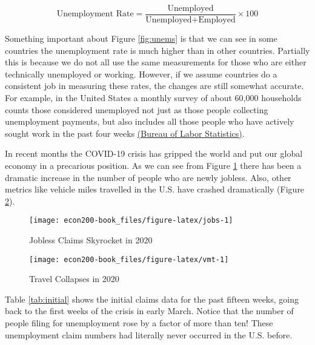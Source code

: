 \documentclass[
]{book}
\begin{document}
\[ \text{Unemployment Rate} = \frac{\text{Unemployed}}{\text{Unemployed} + \text{Employed}} \times 100 \]

Something important about Figure \ref{fig:unems} is that we can see in some countries the unemployment rate is much higher than in other countries. Partially this is because we do not all use the same measurements for those who are either technically unemployed or working. However, if we assume countries do a consistent job in measuring these rates, the changes are still somewhat accurate. For example, in the United States a monthly survey of about 60,000 households counts those considered unemployed not just as those people collecting unemployment payments, but also includes all those people who have actively sought work in the past four weeks \href{https://www.bls.gov/cps/cps_htgm.htm}{(Bureau of Labor Statistics)}.

In recent months the COVID-19 crisis has gripped the world and put our global economy in a precarious position. As we can see from Figure \ref{fig:jobs} there has been a dramatic increase in the number of people who are newly jobless. Also, other metrics like vehicle miles travelled in the U.S. have crashed dramatically (Figure \ref{fig:vmt}).

\begin{figure}

{\centering \texttt{[image: econ200-book\_files/figure-latex/jobs-1]} 

}

\caption{Jobless Claims Skyrocket in 2020}\label{fig:jobs}
\end{figure}

\begin{figure}

{\centering \texttt{[image: econ200-book\_files/figure-latex/vmt-1]} 

}

\caption{Travel Collapses in 2020}\label{fig:vmt}
\end{figure}

Table \ref{tab:initial} shows the initial claims data for the past fifteen weeks, going back to the first weeks of the crisis in early March. Notice that the number of people filing for unemployment rose by a factor of more than ten! These unemployment claim numbers had literally never occurred in the U.S. before.
\end{document}

